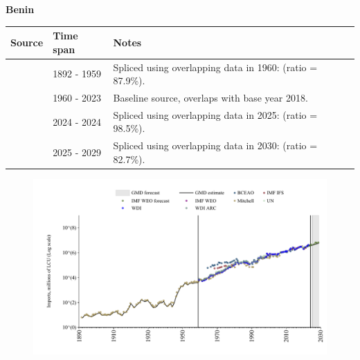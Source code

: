 \documentclass[12pt,a4paper,landscape]{article}
\begin{document}
\begin{adjustbox}{max totalsize={\paperwidth}{\paperheight},center}
\begin{minipage}[t][\textheight][t]{\textwidth}
\vspace*{0.5cm}
{}
\begin{center}
{\Large\bfseries Benin}
\end{center}
\vspace{0.5cm}
\begin{table}[H]
\centering
\small
\begin{tabular}{|l|l|l|}
\hline
\textbf{Source} & \textbf{Time span} & \textbf{Notes} \\
\hline
\rowcolor{white}\cite{Mitchell}& 1892 - 1959 &Spliced using overlapping data in 1960: (ratio = 87.9\%).\\
\rowcolor{lightgray}\cite{WDI}& 1960 - 2023 &Baseline source, overlaps with base year 2018.\\
\rowcolor{white}\cite{BCEAO}& 2024 - 2024 &Spliced using overlapping data in 2025: (ratio = 98.5\%).\\
\rowcolor{lightgray}\cite{IMF_WEO_forecast}& 2025 - 2029 &Spliced using overlapping data in 2030: (ratio = 82.7\%).\\
\hline
\end{tabular}
\end{table}
\begin{figure}[H]
\centering
\includegraphics[width=\textwidth,height=0.6\textheight,keepaspectratio]{graphs/BEN_imports.pdf}
\end{figure}
\end{minipage}
\end{adjustbox}
\end{document}
